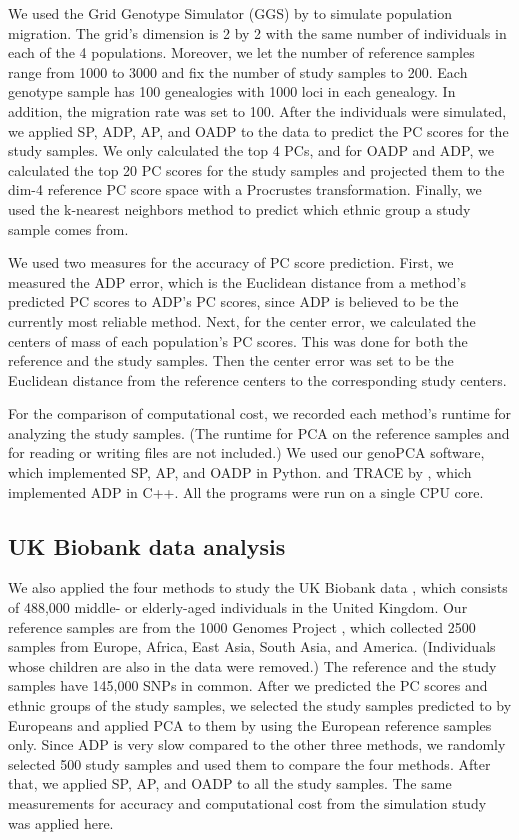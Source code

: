 \documentclass{article}
\begin{document}
We used the Grid Genotype Simulator (GGS)
by \citet{mathieson2012differential}
to simulate population migration.
The grid's dimension is 2 by 2
with the same number of individuals
in each of the 4 populations.
Moreover, we let the number of reference samples
range from 1000 to 3000
and fix the number of study samples to 200.
Each genotype sample has 100 genealogies
with 1000 loci in each genealogy.
In addition, the migration rate was set to 100.
After the individuals were simulated,
we applied SP, ADP, AP, and OADP to the data
to predict the PC scores for the study samples.
We only calculated the top 4 PCs,
and for OADP and ADP,
we calculated the top 20 PC scores for the study samples
and projected them to the dim-4 reference PC score space
with a Procrustes transformation.
Finally, we used the k-nearest neighbors method
to predict which ethnic group a study sample comes from.

We used two measures for the accuracy of PC score prediction.
First, we measured the ADP error,
which is the Euclidean distance
from a method's predicted PC scores
to ADP's PC scores,
since ADP is believed to be the currently most reliable method.
Next, for the center error,
we calculated the centers of mass of each population's PC scores.
This was done for both the reference and the study samples.
Then the center error
was set to be the Euclidean distance
from the reference centers to the corresponding study centers.

For the comparison of computational cost,
we recorded each method's runtime for analyzing the study samples.
(The runtime for PCA on the reference samples
and for reading or writing files are not included.)
We used our genoPCA software,
which implemented SP, AP, and OADP in Python.
and TRACE by \citet{wang2015improved},
which implemented ADP in C++.
All the programs were run on a single CPU core.

\subsection{UK Biobank data analysis}

We also applied the four methods
to study the UK Biobank data \citep{sudlow2015uk},
which consists of 488,000 middle- or elderly-aged individuals
in the United Kingdom.
Our reference samples
are from the 1000 Genomes Project \citep{10002015global},
which collected 2500 samples from Europe, Africa, East Asia, South Asia, and America.
(Individuals whose children are also in the data were removed.)
The reference and the study samples
have 145,000 SNPs in common.
After we predicted the PC scores and ethnic groups
of the study samples,
we selected the study samples predicted to by Europeans
and applied PCA to them
by using the European reference samples only.
Since ADP is very slow compared to the other three methods,
we randomly selected 500 study samples
and used them to compare the four methods.
After that,
we applied SP, AP, and OADP to all the study samples.
The same measurements for accuracy and computational cost
from the simulation study
was applied here.
\end{document}
